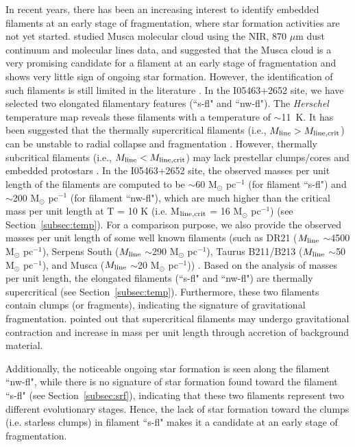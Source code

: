 \documentclass[iop]{emulateapj}
\begin{document}
In recent years, there has been an increasing interest to identify embedded filaments at an early stage of fragmentation, 
where star formation activities are not yet started. \citet{kainulainen16} studied Musca molecular cloud using the NIR, 870 $\mu$m 
dust continuum and molecular lines data, and suggested that the Musca cloud is a very promising candidate for a filament 
at an early stage of fragmentation and shows very little sign of ongoing star formation.
However, the identification of such filaments is still limited in the literature \citep[e.g.,][]{kainulainen16}. 
In the I05463+2652 site, we have selected two elongated filamentary features (``s-fl" and ``nw-fl").
The {\it Herschel} temperature map reveals these filaments with a temperature of $\sim$11~K.
It has been suggested that the thermally supercritical filaments (i.e., $M_{\rm line} > M_{\rm line,crit}$) can be unstable to radial collapse and fragmentation \citep{andre10}. 
However, thermally subcritical filaments (i.e., $M_{\rm line} < M_{\rm line,crit}$) may lack prestellar clumps/cores and embedded protostars \citep{andre10}. 
In the I05463+2652 site, the observed masses per unit length of the filaments are computed to be 
$\sim$60 M$_{\odot}$ pc$^{-1}$ (for filament ``s-fl") and $\sim$200 M$_{\odot}$ pc$^{-1}$ (for filament ``nw-fl"), 
which are much higher than the critical mass per unit length at T = 10 K (i.e. M$_{\rm line,crit}$ = 16 M$_{\odot}$ pc$^{-1}$) (see Section~\ref{subsec:temp}). 
For a comparison purpose, we also provide the observed masses per unit length of some well known filaments
(such as DR21 ($M_{\rm line}$ $\sim$4500 M$_{\odot}$ pc$^{-1}$), Serpens South ($M_{\rm line}$ $\sim$290 M$_{\odot}$ pc$^{-1}$), Taurus B211/B213 ($M_{\rm line}$ $\sim$50 M$_{\odot}$ pc$^{-1}$), and Musca ($M_{\rm line}$ $\sim$20 M$_{\odot}$ pc$^{-1}$)) \citep[see Table~1 in][]{andre16}. 
Based on the analysis of masses per unit length, the elongated filaments (``s-fl" and ``nw-fl") are thermally supercritical (see Section~\ref{subsec:temp}).
Furthermore, these two filaments contain clumps (or fragments), indicating the signature of gravitational fragmentation. \citet{arzoumanian13} pointed out that supercritical filaments may undergo gravitational contraction and increase in mass per unit length through accretion of background material.

Additionally, the noticeable ongoing star formation is seen along the filament ``nw-fl", while 
there is no signature of star formation found toward the filament ``s-fl" (see Section~\ref{subsec:srf}), 
indicating that these two filaments represent two different evolutionary stages. 
Hence, the lack of star formation toward the clumps (i.e. starless clumps) in filament ``s-fl" makes it a candidate at an early stage of fragmentation. 
\end{document}
